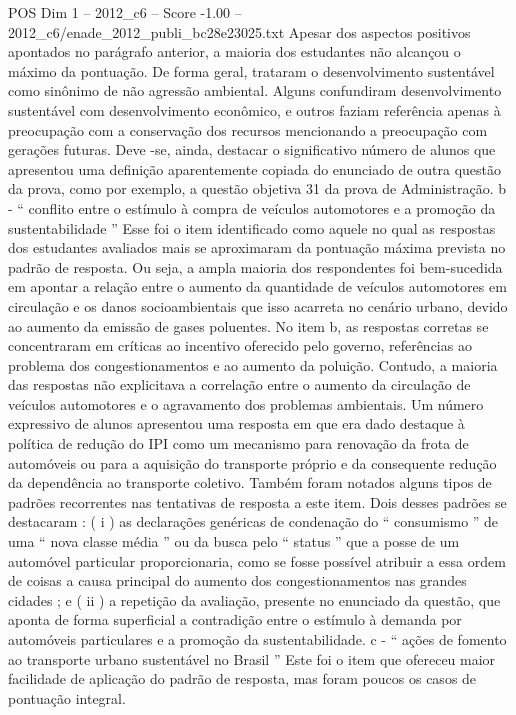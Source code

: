 \begin{textsample}{POS Dim 1 – 2012\_c6 – Score -1.00 – 2012\_c6/enade\_2012\_publi\_bc28e23025.txt}
Apesar dos aspectos positivos apontados no parágrafo anterior, a maioria dos estudantes não alcançou o máximo da pontuação.
De forma geral, trataram o desenvolvimento sustentável como sinônimo de não agressão ambiental.
Alguns confundiram desenvolvimento sustentável com desenvolvimento econômico, e outros faziam referência apenas à preocupação com a conservação dos recursos mencionando a preocupação com gerações futuras.
Deve -se, ainda, destacar o significativo número de alunos que apresentou uma definição aparentemente copiada do enunciado de outra questão da prova, como por exemplo, a questão objetiva 31 da prova de Administração. b - “ conflito entre o estímulo à compra de veículos automotores e a promoção da sustentabilidade ” Esse foi o item identificado como aquele no qual as respostas dos estudantes avaliados mais se aproximaram da pontuação máxima prevista no padrão de resposta.
Ou seja, a ampla maioria dos respondentes foi bem-sucedida em apontar a relação entre o aumento da quantidade de veículos automotores em circulação e os danos socioambientais que isso acarreta no cenário urbano, devido ao aumento da emissão de gases poluentes.
No item b, as respostas corretas se concentraram em críticas ao incentivo oferecido pelo governo, referências ao problema dos congestionamentos e ao aumento da poluição.
Contudo, a maioria das respostas não explicitava a correlação entre o aumento da circulação de veículos automotores e o agravamento dos problemas ambientais.
Um número expressivo de alunos apresentou uma resposta em que era dado destaque à política de redução do IPI como um mecanismo para renovação da frota de automóveis ou para a aquisição do transporte próprio e da consequente redução da dependência ao transporte coletivo.
Também foram notados alguns tipos de padrões recorrentes nas tentativas de resposta a este item.
Dois desses padrões se destacaram : ( i ) as declarações genéricas de condenação do “ consumismo ” de uma “ nova classe média ” ou da busca pelo “ status ” que a posse de um automóvel particular proporcionaria, como se fosse possível atribuir a essa ordem de coisas a causa principal do aumento dos congestionamentos nas grandes cidades ; e ( ii ) a repetição da avaliação, presente no enunciado da questão, que aponta de forma superficial a contradição entre o estímulo à demanda por automóveis particulares e a promoção da sustentabilidade. c - “ ações de fomento ao transporte urbano sustentável no Brasil ” Este foi o item que ofereceu maior facilidade de aplicação do padrão de resposta, mas foram poucos os casos de pontuação integral.

\end{textsample}
